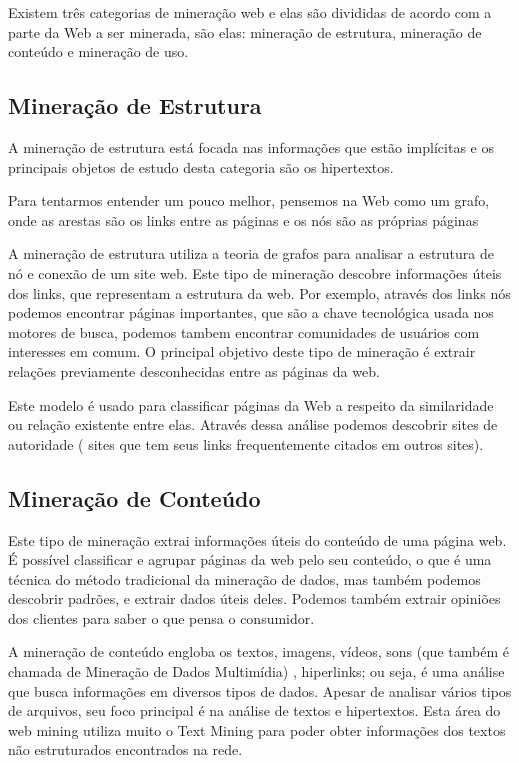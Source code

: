 	Existem três categorias de mineração web e elas são divididas de acordo com a parte da Web a ser minerada, são elas: mineração de estrutura, mineração de conteúdo e mineração de uso.

\subsection{Mineração de Estrutura}

	A mineração de estrutura está focada nas informações que estão implícitas e os principais objetos de estudo desta categoria são os hipertextos.

	Para tentarmos entender um pouco melhor, pensemos na Web como um grafo, onde as arestas são os links entre as páginas e os nós são as próprias páginas

	A mineração de estrutura utiliza a teoria de grafos para analisar a estrutura de nó e conexão  de um site web. Este tipo de mineração descobre informações úteis dos links, que representam a estrutura da web. Por exemplo, através dos links nós podemos encontrar páginas importantes, que são a chave tecnológica usada nos motores de busca, podemos tambem encontrar comunidades de usuários com interesses em comum. O principal objetivo deste tipo de mineração é extrair relações previamente desconhecidas entre as páginas da web.

	Este modelo é usado para classificar páginas da Web a respeito da similaridade ou relação existente entre elas. Através dessa análise podemos descobrir sites de autoridade ( sites que tem seus links frequentemente citados em outros sites).

\subsection{Mineração de Conteúdo}

	Este tipo de mineração extrai informações úteis do conteúdo de uma página web. É possível classificar e agrupar páginas da web pelo seu conteúdo, o que é uma técnica do método tradicional da mineração de dados, mas também podemos descobrir padrões, e extrair dados úteis deles. Podemos também extrair opiniões dos clientes para saber o que pensa o consumidor.

	A mineração de conteúdo engloba os textos, imagens, vídeos, sons (que também é chamada de Mineração de Dados Multimídia) , hiperlinks; ou seja, é uma análise que busca informações em diversos tipos de dados.  Apesar de analisar vários tipos de arquivos, seu foco principal é na análise de textos e hipertextos. Esta área do web mining utiliza muito o Text Mining para poder obter informações dos textos não estruturados encontrados na rede.

